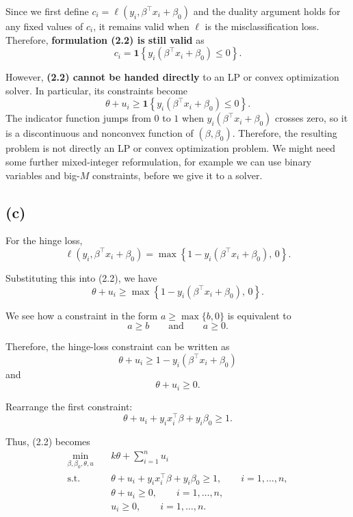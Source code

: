 \documentclass{article}
\begin{document}
Since we first define $c_i=\ell(y_i,\beta^\top x_i+\beta_0)$ and the duality argument holds for any fixed values of $c_i$, it remains valid when $\ell$ is the misclassification loss. Therefore, \textbf{formulation (2.2) is still valid} as 
\[
c_i
=
\mathbf{1}\left\{
y_i(\beta^\top x_i+\beta_0)\leq 0
\right\}.
\]

However, \textbf{(2.2) \textbf{cannot be handed directly}} to an LP or convex optimization
solver. In particular, its constraints become
\[
\theta+u_i
\geq
\mathbf{1}\left\{
y_i(\beta^\top x_i+\beta_0)\leq 0
\right\}.
\]
The indicator function jumps from $0$ to $1$ when
$y_i(\beta^\top x_i+\beta_0)$ crosses zero, so it is a discontinuous and
nonconvex function of $(\beta,\beta_0)$. Therefore, the resulting problem
is not directly an LP or convex optimization problem. We might need some further
mixed-integer reformulation, for example we can use binary variables and
big-$M$ constraints, before we give it to a solver.


\vspace{5mm}

\subsection*{(c)}


For the hinge loss,
\[
\ell(y_i,\beta^\top x_i+\beta_0)
=
\max\left\{
1-y_i(\beta^\top x_i+\beta_0),\,0
\right\}.
\]

Substituting this into (2.2), we have
\[
\theta+u_i
\geq
\max\left\{
1-y_i(\beta^\top x_i+\beta_0),\,0
\right\}.
\]

 We see how a constraint in the form
$
a\geq\max\{b,0\}
$
is equivalent to
\[
a\geq b
\qquad\text{and}\qquad
a\geq0.
\]

Therefore, the hinge-loss constraint can be written as
\[
\theta+u_i
\geq
1-y_i(\beta^\top x_i+\beta_0)
\]
and
\[
\theta+u_i\geq0.
\]

Rearrange the first constraint: 
\[
\theta+u_i+y_i x_i^\top\beta+y_i\beta_0\geq1.
\]

Thus, (2.2) becomes
\[
\boxed{
\begin{aligned}
\min_{\beta,\beta_0,\theta,u}\quad
& k\theta+\sum_{i=1}^n u_i\\
\text{s.t.}\quad
& \theta+u_i+y_i x_i^\top\beta+y_i\beta_0\geq1,
\qquad i=1,\ldots,n,\\
& \theta+u_i\geq0,
\qquad i=1,\ldots,n,\\
& u_i\geq0,
\qquad i=1,\ldots,n.
\end{aligned}}
\]
\end{document}
